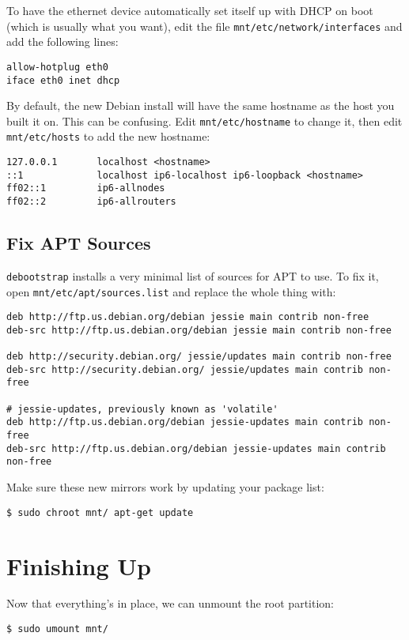 \documentclass{sockitguide}
\begin{document}
To have the ethernet device automatically set itself up with DHCP on
boot (which is usually what you want), edit the file
\texttt{mnt/etc/network/interfaces} and add the following lines:
\begin{verbatim}
allow-hotplug eth0
iface eth0 inet dhcp
\end{verbatim}

By default, the new Debian install will have the same hostname as the
host you built it on. This can be confusing. Edit
\texttt{mnt/etc/hostname} to change it, then edit
\texttt{mnt/etc/hosts} to add the new hostname:
\begin{verbatim}
127.0.0.1       localhost <hostname>
::1             localhost ip6-localhost ip6-loopback <hostname>
ff02::1         ip6-allnodes
ff02::2         ip6-allrouters
\end{verbatim}

\subsection{Fix APT Sources}

\texttt{debootstrap} installs a very minimal list of sources for APT
to use. To fix it, open \texttt{mnt/etc/apt/sources.list} and replace
the whole thing with:
\begin{verbatim}
deb http://ftp.us.debian.org/debian jessie main contrib non-free
deb-src http://ftp.us.debian.org/debian jessie main contrib non-free

deb http://security.debian.org/ jessie/updates main contrib non-free
deb-src http://security.debian.org/ jessie/updates main contrib non-free

# jessie-updates, previously known as 'volatile'
deb http://ftp.us.debian.org/debian jessie-updates main contrib non-free
deb-src http://ftp.us.debian.org/debian jessie-updates main contrib non-free
\end{verbatim}

Make sure these new mirrors work by updating your package list:
\begin{verbatim}
$ sudo chroot mnt/ apt-get update
\end{verbatim}

\section{Finishing Up}

Now that everything's in place, we can unmount the root partition:
\begin{verbatim}
$ sudo umount mnt/
\end{verbatim}
\end{document}
